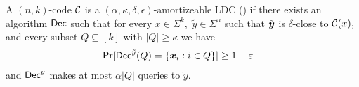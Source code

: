 \begin{definition}
    A $(n,k)$-code $\mathcal{C}$ is a $(\alpha, \kappa, \delta, \epsilon)$-amortizeable LDC (\aLDC) if there exists an algorithm $\mathsf{Dec}$ such that for every $x \in \Sigma^k,$ $\tilde y \in \Sigma^n$ such that $\tilde{\boldsymbol{y}}$ is $\delta$-close to $\mathcal{C}(x),$ and every subset $Q \subseteq [k]$ with $|Q| \geq \kappa$ we have 
    \begin{align*}
    \Pr\lbrack\mathsf{\mathsf{Dec}}^{\tilde y}(Q) &= \{{\boldsymbol{x}}_i : i \in Q\}\rbrack \geq 1 - \varepsilon
    \end{align*}
and $\mathsf{Dec}^{\tilde y}$ makes at most $\alpha|Q|$ queries to $\tilde y$. 
\end{definition}